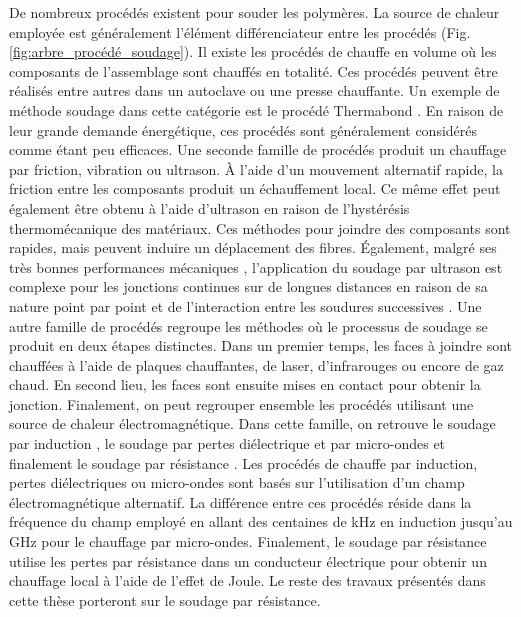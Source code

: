 De nombreux procédés existent pour souder les polymères. 
La source de chaleur employée est généralement l'élément différenciateur entre les procédés (Fig. \ref{fig:arbre_procédé_soudage}). 
Il existe les procédés de chauffe en volume où les composants de l'assemblage sont chauffés en totalité. 
Ces procédés peuvent être réalisés entre autres dans un autoclave ou une presse chauffante. 
Un exemple de méthode soudage dans cette catégorie est le procédé Thermabond \cite{Smiley1991a}. 
En raison de leur grande demande énergétique, ces procédés sont généralement considérés comme étant peu efficaces. 
Une seconde famille de procédés produit un chauffage par friction, vibration \cite{Bates2007d} ou ultrason. 
À l'aide d'un mouvement alternatif rapide, la friction entre les composants produit un échauffement local. 
Ce même effet peut également être obtenu à l'aide d'ultrason en raison de l'hystérésis thermomécanique des matériaux. 
Ces méthodes pour joindre des composants sont rapides, mais peuvent induire un déplacement des fibres. 
Également, malgré ses très bonnes performances mécaniques \cite{Villegas2016}, l'application du soudage par ultrason est complexe pour les jonctions continues sur de longues distances en raison de sa nature point par point et de l'interaction entre les soudures successives \cite{Zhao2018}. 
Une autre famille de procédés regroupe les méthodes où le processus de soudage se produit en deux étapes distinctes. 
Dans un premier temps, les faces à joindre sont chauffées à l'aide de plaques chauffantes, de laser, d'infrarouges ou encore de gaz chaud. 
En second lieu, les faces sont ensuite mises en contact pour obtenir la jonction. 
Finalement, on peut regrouper ensemble les procédés utilisant une source de chaleur électromagnétique. 
Dans cette famille, on retrouve le soudage par induction \cite{Rudolf2000a,Ahmed2006a,Farahani2018}, le soudage  par pertes diélectrique et par micro-ondes \cite{Wu2012,Bowler2006a,Menendez2010d} et finalement le soudage par résistance \cite{houghton1984bonding,Eveno1988,Taylor1991,McKnight1997}. 
Les procédés de chauffe par induction, pertes diélectriques ou micro-ondes sont basés sur l'utilisation d'un champ électromagnétique alternatif. 
La différence entre ces procédés réside dans la fréquence du champ employé en allant des centaines de \si{\kilo\hertz} en induction jusqu'au \si{\giga\hertz} pour le chauffage par micro-ondes. 
Finalement, le soudage par résistance utilise les pertes par résistance dans un conducteur électrique pour obtenir un chauffage local à l'aide de l'effet de Joule. 
Le reste des travaux présentés dans cette thèse porteront sur le soudage par résistance. 

